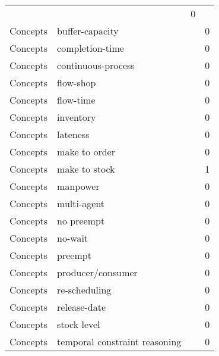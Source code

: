 {\begin{longtable}{lp{10cm}rr}
&  & 0\\Concepts & buffer-capacity &  & 0\\Concepts & completion-time &  & 0\\Concepts & continuous-process &  & 0\\Concepts & flow-shop &  & 0\\Concepts & flow-time &  & 0\\Concepts & inventory &  & 0\\Concepts & lateness &  & 0\\Concepts & make to order &  & 0\\Concepts & make to stock &  & 1\\Concepts & manpower &  & 0\\Concepts & multi-agent &  & 0\\Concepts & no preempt &  & 0\\Concepts & no-wait &  & 0\\Concepts & preempt &  & 0\\Concepts & producer/consumer &  & 0\\Concepts & re-scheduling &  & 0\\Concepts & release-date &  & 0\\Concepts & stock level &  & 0\\Concepts & temporal constraint reasoning &  & 0\\\end{longtable}
}


